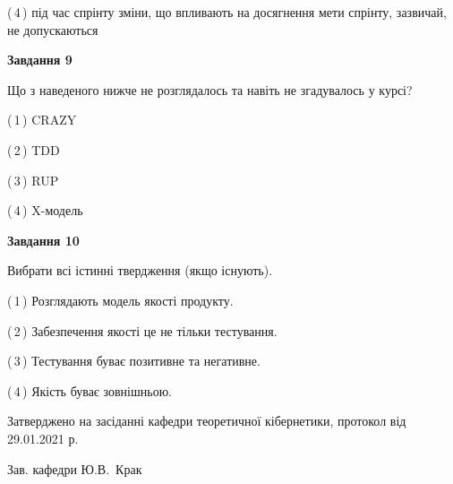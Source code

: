 \documentclass[10pt, ukrainian]{article}
\begin{document}
{\begin {large}
(\,4\,) під час спрінту зміни, що впливають на досягнення мети спрінту, зазвичай, не допускаються%


{\begin {center}\textbf{Завдання 9}\end {center}}\par
Що з наведеного нижче не розглядалось та навіть не згадувалось у курсі?\par
\vspace{2mm}



(\,1\,) CRAZY%



(\,2\,) TDD%



(\,3\,) RUP%



(\,4\,) X-модель%


{\begin {center}\textbf{Завдання 10}\end {center}}\par
Вибрати всі істинні твердження (якщо існують).\par
\vspace{2mm}



(\,1\,) Розглядають модель якості продукту.%



(\,2\,) Забезпечення якості це не тільки тестування.%



(\,3\,) Тестування буває позитивне та негативне.%



(\,4\,) Якість буває зовнішньою.%



\end {large}}
{\vspace{5mm}\smallskip \begin {small} Затверджено на засіданні кафедри теоретичної кібернетики, протокол  від   29.01.2021 р.\par\smallskip\smallskip
{\parbox {6.5 cm}{Зав. кафедри \dotfill Ю.В.~Крак}} \end{small}}
\newpage
\end{document}

